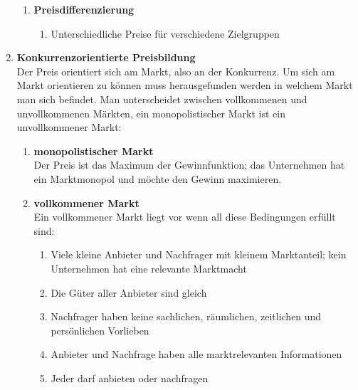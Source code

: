 \begin{flushleft}
\begin{enumerate}
{\begin{enumerate}
{\begin{enumerate}
                        \item Preis kann durch die Kostenstruktur der einzelnen, bevorzugten Eigenschaften gebildet werden
                    \end{enumerate}
                }
                \item {
                    \textbf{Preisdifferenzierung} \\
                    \begin{enumerate}
                        \item Unterschiedliche Preise für verschiedene Zielgruppen
                    \end{enumerate}
                }
            \end{enumerate}
        }
        \item {
            \textbf{Konkurrenzorientierte Preisbildung} \\
            Der Preis orientiert sich am Markt, also an der Konkurrenz.
            Um sich am Markt orientieren zu können muss herausgefunden werden in welchem Markt man sich befindet.
            Man unterscheidet zwischen vollkommenen und unvollkommenen Märkten, ein monopolistischer Markt ist ein unvollkommener Markt:
            \begin{enumerate}
                \item {
                    \textbf{monopolistischer Markt} \\
                    Der Preis ist das Maximum der Gewinnfunktion;
                    das Unternehmen hat ein Marktmonopol und möchte den Gewinn maximieren.
                }
                \item {
                    \textbf{vollkommener Markt} \\
                    Ein vollkommener Markt liegt vor wenn all diese Bedingungen erfüllt sind:
                    \begin{enumerate}
                        \item Viele kleine Anbieter und Nachfrager mit kleinem Marktanteil; kein Unternehmen hat eine relevante Marktmacht
                        \item Die Güter aller Anbieter sind gleich
                        \item Nachfrager haben keine sachlichen, räumlichen, zeitlichen und persönlichen Vorlieben
                        \item Anbieter und Nachfrage haben alle marktrelevanten Informationen
                        \item Jeder darf anbieten oder nachfragen

\end{enumerate}}
\end{enumerate}}
\end{enumerate}
\end{flushleft}
